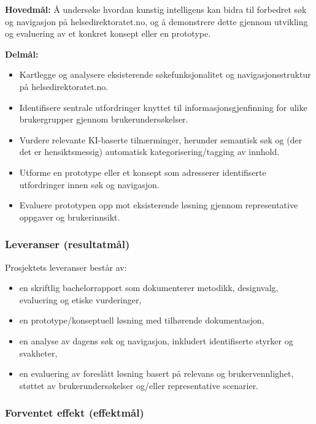 \textbf{Hovedmål:} Å undersøke hvordan kunstig intelligens kan bidra til forbedret søk og navigasjon på helsedirektoratet.no, og å demonstrere dette gjennom utvikling og evaluering av et konkret konsept eller en prototype.

\textbf{Delmål:}
\begin{itemize}
    \item Kartlegge og analysere eksisterende søkefunksjonalitet og navigasjonsstruktur på helsedirektoratet.no.
    \item Identifisere sentrale utfordringer knyttet til informasjonsgjenfinning for ulike brukergrupper gjennom brukerundersøkelser.
    \item Vurdere relevante KI-baserte tilnærminger, herunder semantisk søk og (der det er hensiktsmessig) automatisk kategorisering/tagging av innhold.
    \item Utforme en prototype eller et konsept som adresserer identifiserte utfordringer innen søk og navigasjon.
    \item Evaluere prototypen opp mot eksisterende løsning gjennom representative oppgaver og brukerinnsikt.
\end{itemize}



\subsubsection{Leveranser (resultatmål)}
\label{sec:leveranser}

Prosjektets leveranser består av:
\begin{itemize}
    \item en skriftlig bachelorrapport som dokumenterer metodikk, designvalg, evaluering og etiske vurderinger,
    \item en prototype/konseptuell løsning med tilhørende dokumentasjon,
    \item en analyse av dagens søk og navigasjon, inkludert identifiserte styrker og svakheter,
    \item en evaluering av foreslått løsning basert på relevans og brukervennlighet, støttet av brukerundersøkelser og/eller representative scenarier.
\end{itemize}

\subsubsection{Forventet effekt (effektmål)}
\label{sec:effektmal}

